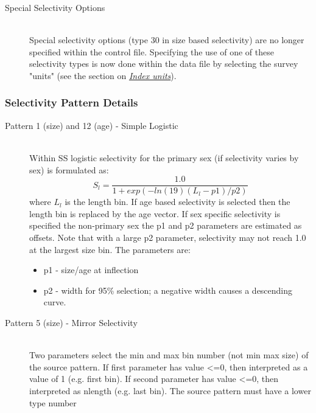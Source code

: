 \begin{description}
	\item[Special Selectivity Options]\hfil\\
	Special selectivity options (type 30 in size based selectivity) are no longer specified within the control file. Specifying the use of one of these selectivity types is now done within the data file by selecting the survey "units" (see the section on \hyperlink{IndexUnits}{\textit{Index units}}).	
\end{description}

\subsubsection{Selectivity Pattern Details}
\begin{description}
	\item[Pattern 1 (size) and 12 (age) - Simple Logistic]\hfill\\
	Within SS logistic selectivity for the primary sex (if selectivity varies by sex) is formulated as:
	\begin{equation}
	S_l = \frac{1.0}{1+exp(-ln(19)(L_l - p1)/p2)}
	\end{equation}
	where $L_l$ is the length bin.  If age based selectivity is selected then the length bin is replaced by the age vector. If sex specific selectivity is specified the non-primary sex the p1 and p2 parameters are estimated as offsets.  Note that with a large p2 parameter, selectivity may not reach 1.0 at the largest size bin. The parameters are:
		\begin{itemize}
			\item p1 - size/age at inflection
			\item p2 - width for 95\% selection; a negative width causes a descending curve.
		\end{itemize}
\end{description}


\begin{description}
	\item[Pattern 5 (size) - Mirror Selectivity]\hfil\\
	Two parameters select the min and max bin number (not min max size) of the source pattern.  If first parameter has value <=0, then interpreted as a value of 1 (e.g. first bin).  If second parameter has value <=0, then interpreted as nlength (e.g. last bin). The source pattern must have a lower type number
\end{description}	


